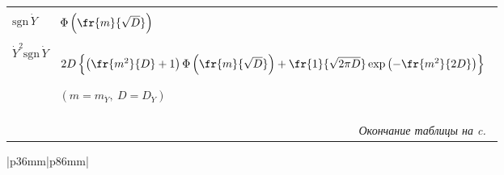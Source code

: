 {\begin{table}[b]
\begin{center}
\begin{tabular}{|p{35mm}|p{87mm}|}
\hline

&\\[-9pt]

$\mathrm{sgn}\, \dot Y$&$ \Phi \left(\fr{m}{\sqrt{D}}\right)$\\[11pt]

\hline

&\\[-8pt]

$\dot Y^{2} \mathrm{sgn}\, \dot Y$&$

2D \left\{ \left(\fr{m^2}{D} +1\right) \Phi \left(\fr{m}{\sqrt{D}}\right) + 

\fr{1}{\sqrt{2\pi D}} \exp \left(-\fr{m^2}{2D}\right)\right\}$\ 

$\left(m = m_{\dot Y},\ D=D_{\dot Y}\right)$\\[-8pt]

&\\

\hline

\multicolumn{2}{r}{\textit{Окончание таблицы на c.}~\pageref{tp.1-a}}

\end{tabular}

\end{center}

\vspace*{-12pt}

\end{table}



\begin{table}\small

\begin{center}

\label{tp.1-a}




\tabcolsep=3pt

\begin{tabular}{|p{36mm}|p{86mm}|}

\\

\\[-6pt]

\hline

\end{tabular}
\end{center}
\end{table}}
